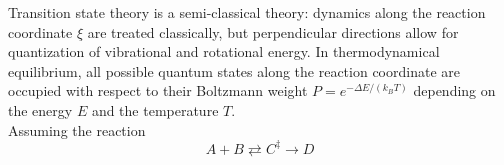 \documentclass[11pt,DIV=13,BCOR=5mm,a4paper,headinclude]{scrbook}
\begin{document}
Transition state theory is a semi-classical theory: dynamics along the reaction coordinate $\xi$ are treated classically, but perpendicular directions allow for quantization of vibrational and rotational energy.
In thermodynamical equilibrium, all possible quantum states along the reaction coordinate are occupied with respect to their Boltzmann weight $P=e^{-\Delta E/(k_BT)}$ depending on the energy $E$ and the temperature $T$.
\\
Assuming the reaction
\begin{equation}
A+ B \rightleftarrows C^\ddagger \rightarrow D
\end{equation}
\end{document}
